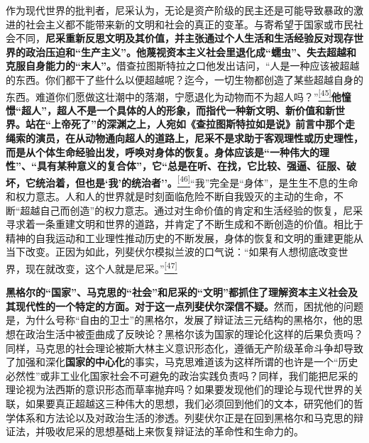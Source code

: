 \documentclass[UTF8, fontset = sourcesans, a4paper, oneside, zihao =
-4, scheme=chinese, no-math, space=true]{ctexbook}
\begin{document}
作为现代世界的批判者，尼采认为，无论是资产阶级的民主还是可能导致暴政的激进的社会主义都不能带来新的文明和社会的真正的变革。与寄希望于国家或市民社会不同，\textbf{尼采重新反思文明及其价值，并主张通过个人生活和生活经验反对现存世界的政治压迫和``生产主义''。他蔑视资本主义社会里退化成``蠕虫''、失去超越和克服自身能力的``末人''。}借查拉图斯特拉之口他发出诘问，``人是一种应该被超越的东西。你们都干了些什么以便超越呢？迄今，一切生物都创造了某些超越自身的东西。难道你们愿做这壮潮中的落潮，宁愿退化为动物而不为超人吗？''\protect\hypertarget{part0005_split_003.htmlux5cux23w45}{}{}\protect\hyperlink{part0005_split_003.htmlux5cux23m45}{\textsuperscript{{[}45{]}}}\textbf{他憧憬``超人''，超人不是一个具体的人的形象，而指代一种新文明、新价值和新世界。站在``上帝死了''的深渊之上，人宛如《查拉图斯特拉如是说》前言中那个走绳索的演员，在从动物通向超人的道路上，尼采不是求助于客观理性或历史理性，而是从个体生命经验出发，呼唤对身体的恢复。身体应该是``一种伟大的理性''、``具有某种意义的复合体''，它``总是在听、在找，它比较、强逼、征服、破坏，它统治着，但也是`我'的统治者''。}\protect\hypertarget{part0005_split_003.htmlux5cux23w46}{}{}\protect\hyperlink{part0005_split_003.htmlux5cux23m46}{\textsuperscript{{[}46{]}}}``我''完全是``身体''，是生生不息的生命和权力意志。人和人的世界就是时刻面临危险不断自我毁灭的主动的生命，不断``超越自己而创造''的权力意志。通过对生命价值的肯定和生活经验的恢复，尼采寻求着一条重建文明和世界的道路，并肯定了不断生成和不断创造的价值。相比于精神的自我运动和工业理性推动历史的不断发展，身体的恢复和文明的重建更能从当下改变。正因为如此，列斐伏尔模拟兰波的口气说：``如果有人想彻底改变世界，现在就改变，这个人就是尼采。''\protect\hypertarget{part0005_split_003.htmlux5cux23w47}{}{}\protect\hyperlink{part0005_split_003.htmlux5cux23m47}{\textsuperscript{{[}47{]}}}

\textbf{黑格尔的``国家''、马克思的``社会''和尼采的``文明''都抓住了理解资本主义社会及其现代性的一个特定的方面。对于这一点列斐伏尔深信不疑。}然而，困扰他的问题是，为什么号称``自由的卫士''的黑格尔，发展了辩证法三元结构的黑格尔，他的思想在政治生活中被歪曲成了反映论？黑格尔该为国家的理论化这样的后果负责吗？同样，马克思的社会理论被斯大林主义意识形态化，遵循无产阶级革命斗争却导致了加强和深化\textbf{国家的中心化}的事实，马克思难道该为这样所谓的也许是一个``历史必然性''或非工业化国家社会不可避免的政治实践负责吗？同样，我们能把尼采的理论视为法西斯的意识形态而草率抛弃吗？如果要发现他们的理论与现代世界的关联，如果要真正超越这三种伟大的思想，我们必须回到他们的文本，研究他们的哲学体系和方法论以及对政治生活的渗透。列斐伏尔正是在回到黑格尔和马克思的辩证法，并吸收尼采的思想基础上来恢复辩证法的革命性和生命力的。
\end{document}
